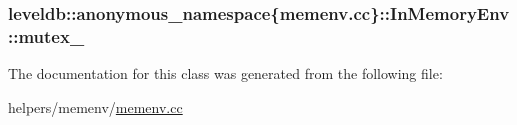 \subsubsection[{mutex\+\_\+}]{ leveldb\+::anonymous\+\_\+namespace\{memenv.\+cc\}\+::In\+Memory\+Env\+::mutex\+\_\+\hspace{0.3cm}{\ttfamily [private]}}\label{classleveldb_1_1anonymous__namespace_02memenv_8cc_03_1_1_in_memory_env_ae70efa79fc801940537e4f31cec193ad}


The documentation for this class was generated from the following file\+:\begin{DoxyCompactItemize}
\item 
helpers/memenv/\hyperlink{memenv_8cc}{memenv.\+cc}\end{DoxyCompactItemize}
